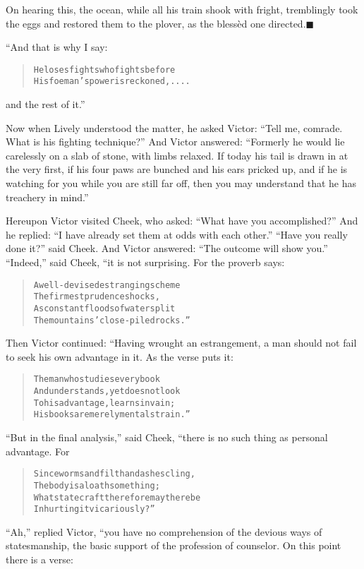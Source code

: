 \documentclass[article, twoside, 14pt]{memoir}
\newcommand{\qed}{\hfill \ensuremath{\blacksquare}}
\renewenvironment{verbatim}{%
\begin{quote}%
\vskip -10pt%
\begin{alltt}\normalfont\large}{\end{alltt}%
\end{quote}%
\vskip -10pt
} %
\begin{document}
On hearing this, the ocean, while all his train shook with fright,
tremblingly took the eggs and restored them to the plover, as the
blessèd one directed.\hyperref[s18]{\qed}

“And that is why I say:

\begin{verbatim}
He loses fights who fights before
    His foeman's power is reckoned, ....
\end{verbatim}
and the rest of it.”

Now when Lively understood the matter, he asked Victor:
``Tell me, comrade. What is his fighting technique?'' And Victor
answered:
``Formerly he would lie carelessly on a slab of stone, with limbs relaxed. If today his tail is drawn in at the very first, if his four paws are bunched and his ears pricked up, and if he is watching for you while you are still far off, then you may understand that he has treachery in mind.''

Hereupon Victor visited Cheek, who asked:
``What have you accomplished?'' And he replied:
``I have already set them at odds with each other.''
``Have you really done it?'' said Cheek. And Victor answered:
``The outcome will show you.'' ``Indeed,'' said Cheek, “it is not
surprising. For the proverb says:

\begin{verbatim}
A well-devised estranging scheme
    The firmest prudence shocks,
As constant floods of water split
    The mountains' close-piled rocks.”
\end{verbatim}
Then Victor continued: “Having wrought an estrangement, a man
should not fail to seek his own advantage in it. As the verse puts
it:

\begin{verbatim}
The man who studies every book
And understands, yet does not look
To his advantage, learns in vain;
His books are merely mental strain.”
\end{verbatim}
``But in the final analysis,'' said Cheek, “there is no such thing
as personal advantage. For

\begin{verbatim}
Since worms and filth and ashes cling,
The body is a loathsome thing;
What statecraft therefore may there be
In hurting it vicariously?”
\end{verbatim}
``Ah,'' replied Victor, “you have no comprehension of the devious
ways of statesmanship, the basic support of the profession of
counselor. On this point there is a verse:
\end{document}
